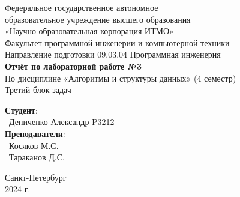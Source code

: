 \documentclass{article}
\begin{document}
\begin{center}
    \Large
    Федеральное государственное автономное \\
    образовательное учреждение высшего образования \\ 
    «Научно-образовательная корпорация ИТМО»\\
    \vspace{0.5cm}
    \large
    Факультет программной инженерии и компьютерной техники \\
    Направление подготовки 09.03.04 Программная инженерия \\
    \vspace{1cm}
    \Large
    \textbf{Отчёт по лабораторной работе №3} \\
    По дисциплине «Алгоритмы и структуры данных» (4 семестр)\\
    Третий блок задач\\
    \large
    \vspace{8cm}

    \begin{minipage}{.33\textwidth}
    \end{minipage}
    \hfill
    \begin{minipage}{.4\textwidth}
    
        \textbf{Студент}: \vspace{.1cm} \\
        \ Дениченко Александр P3212 \vspace{.1cm}\\
        \textbf{Преподаватели}:  \vspace{.1cm}\\
        \ Косяков М.С. \\
        \ Тараканов Д.С.
    \end{minipage}
    \vfill
Санкт-Петербург\\ 2024 г.
\end{center}

\newpage
\end{document}
